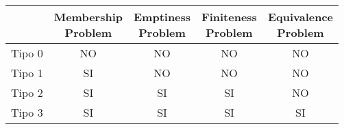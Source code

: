 \documentclass{subfiles}
\begin{document}
\begin{center}
    \begin{tabular}{|c|c|c|c|c|}
        \hline
               & \makecell*{Membership                \\ Problem} & \makecell*{Emptiness \\ Problem} & \makecell*{Finiteness \\ Problem} & \makecell*{Equivalence \\ Problem} \\
        \hline
        Tipo 0 & NO                    & NO & NO & NO \\
        Tipo 1 & SI                    & NO & NO & NO \\
        Tipo 2 & SI                    & SI & SI & NO \\
        Tipo 3 & SI                    & SI & SI & SI \\
        \hline
    \end{tabular}
\end{center}
\end{document}
